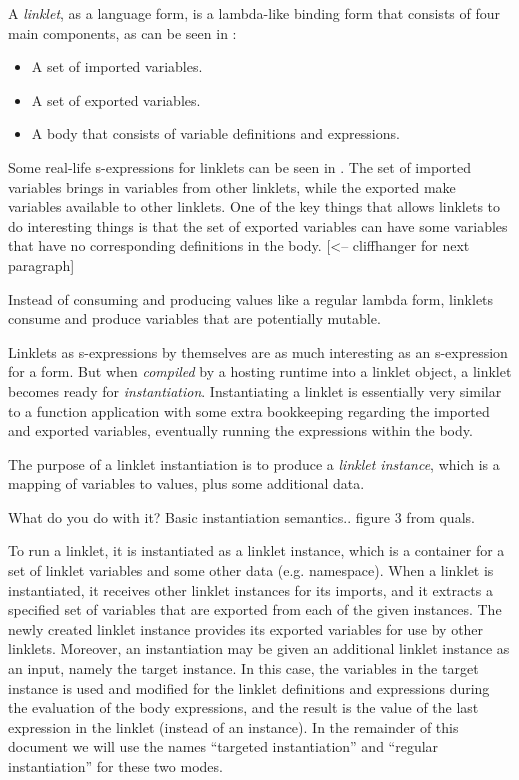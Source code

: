 		\begin{paragraph-here}
			A \emph{linklet}, as a language form, is a lambda-like binding form that consists of four main components, as can be seen in :

			\begin{itemize}
				\item A set of imported variables.
				\item A set of exported variables.
				\item A body that consists of variable definitions and expressions.
			\end{itemize}

			Some real-life s-expressions for linklets can be seen in . The set of imported variables brings in variables from other linklets, while the exported make variables available to other linklets. One of the key things that allows linklets to do interesting things is that the set of exported variables can have some variables that have no corresponding definitions in the body. [<-- cliffhanger for next paragraph]
		\end{paragraph-here}

		Instead of consuming and producing values like a regular lambda form, linklets consume and produce variables that are potentially mutable.

		\begin{paragraph-here}
			Linklets as s-expressions by themselves are as much interesting as an s-expression for a  form. But when \emph{compiled} by a hosting runtime into a linklet object, a linklet becomes ready for \emph{instantiation}. Instantiating a linklet is essentially very similar to a function application with some extra bookkeeping regarding the imported and exported variables, eventually running the expressions within the body.


			The purpose of a linklet instantiation is to produce a \emph{linklet instance}, which is a mapping of variables to values, plus some additional data.

			What do you do with it? Basic instantiation semantics.. figure 3 from quals.
		\end{paragraph-here}

		To run a linklet, it is instantiated as a linklet instance, which is a container for a set of linklet variables and some other data (e.g. namespace). When a linklet is instantiated, it receives other linklet instances for its imports, and it extracts a specified set of variables that are exported from each of the given instances. The newly created linklet instance provides its exported variables for use by other linklets. Moreover, an instantiation may be given an additional linklet instance as an input, namely the target instance. In this case, the variables in the target instance is used and modified for the linklet definitions and expressions during the evaluation of the body expressions, and the result is the value of the last expression in the linklet (instead of an instance). In the remainder of this document we will use the names “targeted instantiation” and “regular instantiation” for these two modes. 


